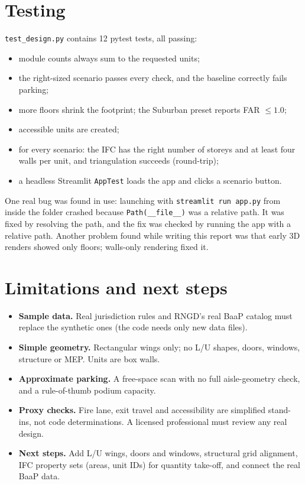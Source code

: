 \documentclass[11pt]{article}
\begin{document}
\section{Testing}
\texttt{test\_design.py} contains 12 pytest tests, all passing:
\begin{itemize}[nosep]
\item module counts always sum to the requested units;
\item the right-sized scenario passes every check, and the baseline correctly fails parking;
\item more floors shrink the footprint; the Suburban preset reports FAR $\le 1.0$;
\item accessible units are created;
\item for every scenario: the IFC has the right number of storeys and at least four walls per unit, and triangulation succeeds (round-trip);
\item a headless Streamlit \texttt{AppTest} loads the app and clicks a scenario button.
\end{itemize}
One real bug was found in use: launching with \texttt{streamlit run app.py} from inside the folder crashed because \texttt{Path(\_\_file\_\_)} was a relative path. It was fixed by resolving the path, and the fix was checked by running the app with a relative path. Another problem found while writing this report was that early 3D renders showed only floors; walls-only rendering fixed it.

\section{Limitations and next steps}
\begin{itemize}
\item \textbf{Sample data.} Real jurisdiction rules and RNGD's real BaaP catalog must replace the synthetic ones (the code needs only new data files).
\item \textbf{Simple geometry.} Rectangular wings only; no L/U shapes, doors, windows, structure or MEP. Units are box walls.
\item \textbf{Approximate parking.} A free-space scan with no full aisle-geometry check, and a rule-of-thumb podium capacity.
\item \textbf{Proxy checks.} Fire lane, exit travel and accessibility are simplified stand-ins, not code determinations. A licensed professional must review any real design.
\item \textbf{Next steps.} Add L/U wings, doors and windows, structural grid alignment, IFC property sets (areas, unit IDs) for quantity take-off, and connect the real BaaP data.
\end{itemize}
\end{document}
